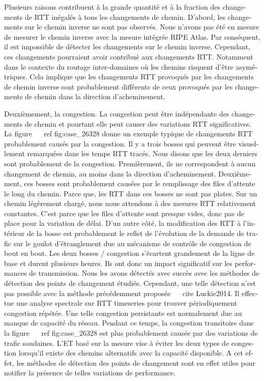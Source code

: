 \begin{otherlanguage}{french}
Plusieurs raisons contribuent à la grande quantité et à la fraction des changements de RTT inégalés à tous les changements de chemin.
D'abord, les changements sur le chemin inverse ne sont pas observés.
Nous n'avons pas été en mesure de mesurer le chemin inverse avec la mesure intégrée RIPE Atlas.
Par conséquent, il est impossible de détecter les changements sur le chemin inverse.
Cependant, ces changements pourraient avoir contribué aux changements RTT.
Notamment dans le contexte du routage inter-domaines où les chemins risquent d'être asymétriques.
Cela implique que les changements RTT provoqués par les changements de chemin inverse sont probablement différents de ceux provoqués par les changements de chemin dans la direction d'acheminement.

Deuxièmement, la congestion.
La congestion peut être indépendante des changements de chemin et pourtant elle peut causer des variations RTT significatives.
La figure ~ \ ref {fig:case_26328} donne un exemple typique de changements RTT probablement causés par la congestion.
Il y a trois bosses qui peuvent être visuellement remarquées dans les temps RTT tracés.
Nous disons que les deux derniers sont probablement de la congestion.
Premièrement, ils ne correspondent à aucun changement de chemin, au moins dans la direction d'acheminement.
Deuxièmement, ces bosses sont probablement causées par le remplissage des files d'attente le long du chemin.
Parce que, les RTT dans ces bosses ne sont pas plates.
Sur un chemin légèrement chargé, nous nous attendons à des mesures RTT relativement constantes.
C'est parce que les files d'attente sont presque vides, donc pas de place pour la variation de délai.
D'un autre côté, la modification des RTT à l'intérieur de la bosse est probablement le reflet de l'évolution de la demande de trafic sur le goulot d'étranglement due au mécanisme de contrôle de congestion de bout en bout.
Les deux bosses / congestion s'écartent grandement de la ligne de base et durent plusieurs heures.
Ils ont donc un impact significatif sur les performances de transmission.
Nous les avons détectés avec succès avec les méthodes de détection des points de changement étudiés.
Cependant, une telle détection n'est pas possible avec la méthode précédemment proposée ~ \ cite {Luckie2014}.
Il effectue une analyse spectrale sur RTT timeseries pour trouver périodiquement congestion répétée.
Une telle congestion persistante est normalement due au manque de capacité du réseau.
Pendant ce temps, la congestion transitoire dans la figure ~ \ ref {fig:case_26328} est plus probablement causée par des variations de trafic soudaines.
L'ET basé sur la mesure vise à éviter les deux types de congestion lorsqu'il existe des chemins alternatifs avec la capacité disponible.
A cet effet, les méthodes de détection des points de changement sont en effet utiles pour notifier la présence de telles variations de performance.


\end{otherlanguage}
